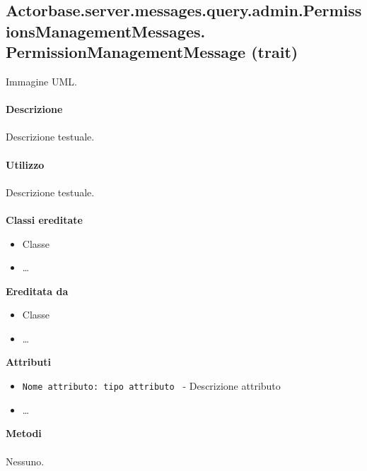 \documentclass[a4paper]{article}
\begin{document}
	\subsection{Actorbase.server.messages.query.admin.PermissionsManagementMessages.
	\newline PermissionManagementMessage (trait)}
		Immagine UML.
		\\ \\
		\textbf{Descrizione}
			\\ \\
			Descrizione testuale.
			\\ \\
		\textbf{Utilizzo}
			\\ \\
			Descrizione testuale.
			\\ \\
		\textbf{Classi ereditate}
			\begin{itemize}
				\item Classe
				\item \dots
			\end{itemize}
		\textbf{Ereditata da}
			\begin{itemize}
				\item Classe
				\item \dots
			\end{itemize}
		\textbf{Attributi}
			\begin{itemize}
				\item \texttt{Nome attributo: tipo attributo } - Descrizione attributo
				\item \dots
			\end{itemize}
		\textbf{Metodi}
			\\ \\
			Nessuno.
			
\end{document}
